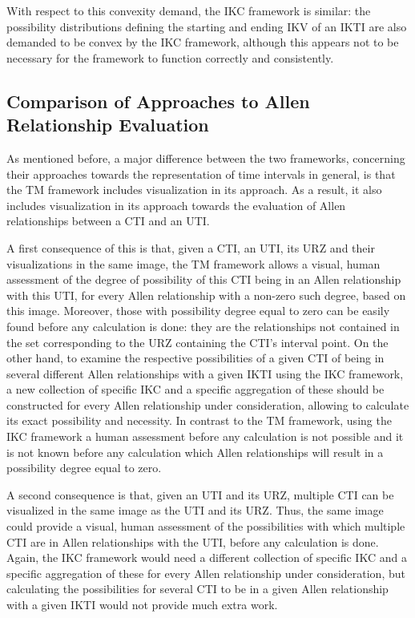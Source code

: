 With respect to this convexity demand, the IKC framework is similar: the possibility distributions defining the starting and ending IKV of an IKTI are also demanded to be convex by the IKC framework, although this appears not to be necessary for the framework to function correctly and consistently.

\subsection{\label{subsec:comp-eval}Comparison of Approaches to Allen Relationship Evaluation}
As mentioned before, a major difference between the two frameworks, concerning their approaches towards the representation of time intervals in general, is that the TM framework includes visualization in its approach. As a result, it also includes visualization in its approach towards the evaluation of Allen relationships between a CTI and an UTI.

A first consequence of this is that, given a CTI, an UTI, its URZ and their visualizations in the same image, the TM framework allows a visual, human assessment of the degree of possibility of this CTI being in an Allen relationship with this UTI, for every Allen relationship with a non-zero such degree, based on this image. Moreover, those with possibility degree equal to zero can be easily found before any calculation is done: they are the relationships not contained in the set corresponding to the URZ containing the CTI's interval point. On the other hand, to examine the respective possibilities of a given CTI of being in several different Allen relationships with a given IKTI using the IKC framework, a new collection of specific IKC and a specific aggregation of these should be constructed for every Allen relationship under consideration, allowing to calculate its exact possibility and necessity. In contrast to the TM framework, using the IKC framework a human assessment before any calculation is not possible and it is not known before any calculation which Allen relationships will result in a possibility degree equal to zero.

A second consequence is that, given an UTI and its URZ, multiple CTI can be visualized in the same image as the UTI and its URZ. Thus, the same image could provide a visual, human assessment of the possibilities with which multiple CTI are in Allen relationships with the UTI, before any calculation is done. Again, the IKC framework would need a different collection of specific IKC and a specific aggregation of these for every Allen relationship under consideration, but calculating the possibilities for several CTI to be in a given Allen relationship with a given IKTI would not provide much extra work.

